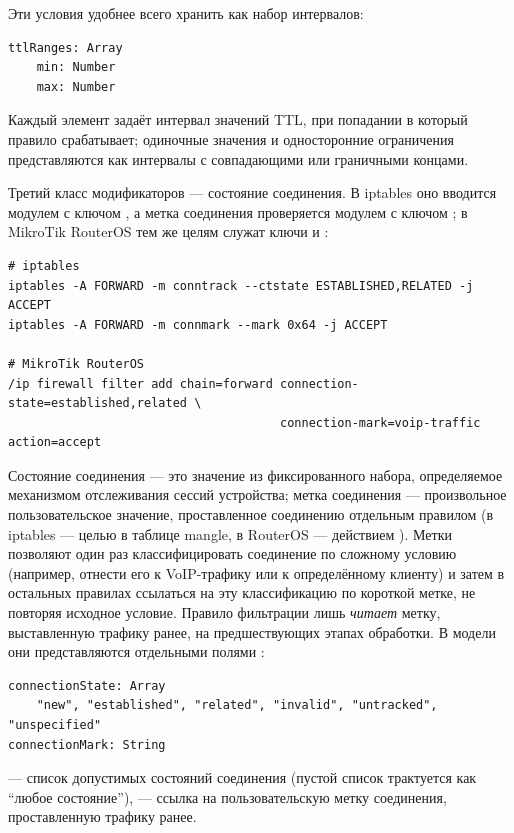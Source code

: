 Эти условия удобнее всего хранить как набор интервалов:

\begin{lstlisting}[style=schemastyle]
ttlRanges: Array
    min: Number
    max: Number
\end{lstlisting}

Каждый элемент задаёт интервал значений TTL, при попадании в который правило срабатывает; одиночные значения и односторонние ограничения представляются как интервалы с совпадающими или граничными концами.

Третий класс модификаторов --- состояние соединения. В iptables оно вводится модулем  с ключом , а метка соединения проверяется модулем  с ключом ; в MikroTik RouterOS тем же целям служат ключи  и :

\begin{verbatim}
# iptables
iptables -A FORWARD -m conntrack --ctstate ESTABLISHED,RELATED -j ACCEPT
iptables -A FORWARD -m connmark --mark 0x64 -j ACCEPT

# MikroTik RouterOS
/ip firewall filter add chain=forward connection-state=established,related \
                                      connection-mark=voip-traffic action=accept
\end{verbatim}

Состояние соединения --- это значение из фиксированного набора, определяемое механизмом отслеживания сессий устройства; метка соединения --- произвольное пользовательское значение, проставленное соединению отдельным правилом (в iptables --- целью  в таблице mangle, в RouterOS --- действием ). Метки позволяют один раз классифицировать соединение по сложному условию (например, отнести его к VoIP-трафику или к определённому клиенту) и затем в остальных правилах ссылаться на эту классификацию по короткой метке, не повторяя исходное условие. Правило фильтрации лишь \emph{читает} метку, выставленную трафику ранее, на предшествующих этапах обработки. В модели они представляются отдельными полями :

\begin{lstlisting}[style=schemastyle]
connectionState: Array
    "new", "established", "related", "invalid", "untracked", "unspecified"
connectionMark: String
\end{lstlisting}

 --- список допустимых состояний соединения (пустой список трактуется как ``любое состояние''),  --- ссылка на пользовательскую метку соединения, проставленную трафику ранее.

